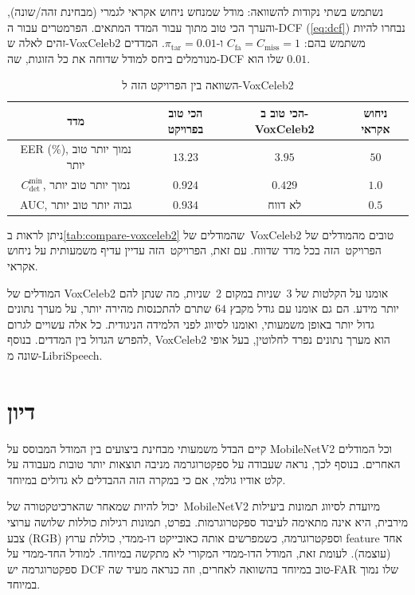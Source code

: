 \documentclass[hebrew, a4paper]{article}
\theoremstyle{plain}
\theoremstyle{definition}
\numberwithin{equation}{section}
\begin{document}
נשתמש בשתי נקודות להשוואה: מודל שמנחש ניחוש אקראי לגמרי (מבחינת
זהה/שונה), והערך הכי טוב מתוך  עבור המדד המתאים.
הפרמטרים עבור ה-DCF (\autoref{eq:dcf}) נבחרו להיות זהים לאלה
ש-VoxCeleb2 משתמש בהם: $C_{\mathrm{fa}} = C_{\mathrm{miss}} = 1$
ו-$\pi_{\mathrm{tar}} = \num{0.01}$. המדדים מנורמלים ביחס למודל שדוחה
את כל הזוגות, שה-DCF שלו הוא $\num{0.01}$.

\begin{table}[h]
  \centering
  \begin{tabular}{cccc}
    מדד & הכי טוב בפרויקט & הכי טוב ב-VoxCeleb2 & ניחוש אקראי \\\hline
    EER \textenglish{($\unit{\percent}$)}, נמוך יותר טוב יותר & $\num{13.23}$ & $\num{3.95}$ & $\num{50}$ \\
    $C^{\min}_{\det}$, נמוך יותר טוב יותר & $\num{0.924}$ & $\num{0.429}$ & $\num{1.0}$ \\
    AUC, גבוה יותר טוב יותר & $\num{0.934}$ & לא דווח & $\num{0.5}$
  \end{tabular}
  \caption{השוואה בין הפרויקט הזה ל-VoxCeleb2}
  \label{tab:compare-voxceleb2}
\end{table}

ניתן לראות ב\autoref{tab:compare-voxceleb2} שהמודלים של~VoxCeleb2
טובים מהמודלים של הפרויקט~הזה בכל מדד שדווח. עם זאת, הפרויקט~הזה עדיין
עדיף משמעותית על ניחוש אקראי.

המודלים של VoxCeleb2 אומנו על הקלטות של 3~שניות במקום 2~שניות, מה שנתן
להם יותר מידע. הם גם אומנו עם גודל מקבץ $64$ שתרם להתכנסות מהירה יותר,
על מערך נתונים גדול יותר באופן משמעותי, ואומנו לסיווג לפני הלמידה
הניגודית. כל אלה עשויים לגרום להפרש הגדול בין המדדים. בנוסף,
VoxCeleb2 הוא מערך נתונים נפרד לחלוטין, בעל אופי שונה מ-LibriSpeech.

\section{דיון}
\label{sec:discussion}

קיים הבדל משמעותי מבחינת ביצועים בין המודל המבוסס על MobileNetV2 וכל
המודלים האחרים. בנוסף לכך, נראה שעבודה על ספקטרוגרמה מניבה תוצאות יותר
טובות מעבודה על קלט אודיו גולמי, אם כי במקרה הזה ההבדלים לא גדולים
במיוחד.

יכול להיות שמאחר שהארכיטקטורה של~MobileNetV2 מיועדת לסיווג תמונות
ביעילות מירבית, היא אינה מתאימה לעיבוד ספקטרוגרמות. בפרט, תמונות
רגילות כוללות שלושה ערוצי צבע (RGB) וספקטרוגרמה, כשמפרשים אותה
כאובייקט דו-ממדי, כוללת ערוץ feature אחד (עוצמה). לעומת זאת, המודל
הדו-ממדי המקורי לא מתקשה במיוחד. למודל החד-ממדי על ספקטרוגרמה יש DCF
טוב במיוחד בהשוואה לאחרים, וזה כנראה מעיד שה-FAR שלו נמוך במיוחד.
\end{document}
